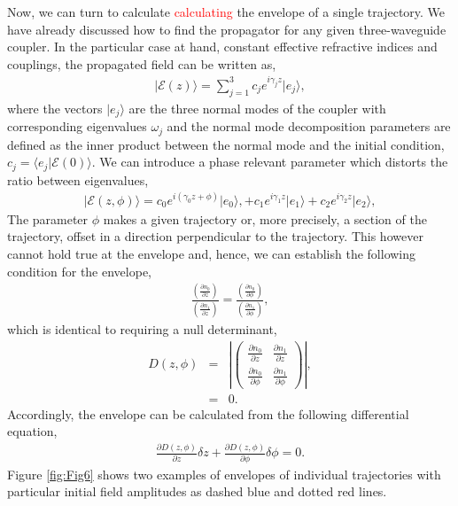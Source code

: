 \documentclass[9pt,twocolumn,twoside]{osajnl}
\begin{document}
Now, we can turn to calculate
\textcolor{red}{calculating} the envelope of a single trajectory. 
We have already discussed how to find the propagator for any given three-waveguide coupler. 
In the particular case at hand, constant effective refractive indices and couplings, the propagated field can be written as, 
\begin{eqnarray}
	\vert \mathcal{E}(z) \rangle =  \sum_{j=1}^{3} c_j e^{i \gamma_j z} \vert e_j \rangle,
\end{eqnarray}
where the vectors $\vert e_j \rangle$ are the three normal modes of the coupler with corresponding eigenvalues $\omega_j$ and the normal mode decomposition parameters are defined as the inner product between the normal mode and the initial condition,  $c_{j} = \langle e_{j} \vert \mathcal{E}(0) \rangle$. 
We can introduce a phase relevant parameter which distorts the ratio between eigenvalues, 
\begin{eqnarray}
\vert \mathcal{E}(z, \phi) \rangle = c_0 e^{i \left( \gamma_0 z + \phi \right) } \vert e_0 \rangle, + c_1 e^{i \gamma_1 z} \vert e_1 \rangle + c_2 e^{i \gamma_2 z} \vert e_2 \rangle,
\end{eqnarray}
The parameter $\phi$ makes a given trajectory or, more precisely, a section of the trajectory, offset in a direction perpendicular to the trajectory.
This however cannot hold true at the envelope and, hence, we can establish the following condition for the envelope,
\begin{eqnarray}
	\frac{ (\frac{\partial n_0}{\partial z}) }{ (\frac{\partial n_1}{\partial z}) } = \frac{( \frac{\partial n_0}{\partial \phi})}{(\frac{\partial n_1}{\partial \phi}) } ,
\end{eqnarray}
which is identical to requiring a null determinant,
\begin{eqnarray}
	D(z, \phi) &=& \left\vert \left(  \begin{array}{cc} 
		\frac{\partial n_0}{\partial z} & \frac{\partial n_1}{\partial z} \\
		\frac{\partial n_0}{\partial \phi} & \frac{\partial n_1}{\partial \phi} 
	\end{array} \right) \right\vert, \\
	&=& 0.
\end{eqnarray}
Accordingly, the envelope can be calculated from the following differential equation,
\begin{eqnarray}
	\frac{\partial D(z,\phi)}{\partial z} \delta z +
	\frac{\partial D(z,\phi)}{\partial \phi} \delta \phi = 0. \label{eq:EnvInd}
\end{eqnarray}
Figure \ref{fig:Fig6} shows two examples of envelopes of individual trajectories with particular initial field amplitudes as dashed blue and dotted red lines. 
\end{document}
